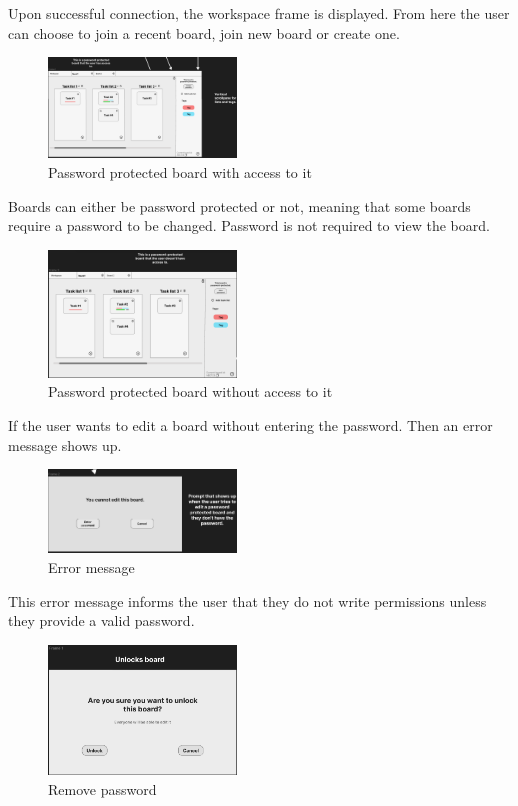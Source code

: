 Upon successful connection, the workspace frame is displayed. From here the user can choose to join a recent board, join new board or create one.

\begin{figure}[H]
\includegraphics[width=5cm]{content/mockups/overview_frame_1.png} 
\caption{Password protected board with access to it}
\end{figure}

Boards can either be password protected or not, meaning that some boards require a password to be changed. Password is not required to view the board.

\begin{figure}[H]
\includegraphics[width=5cm]{content/mockups/overview_frame_3.png} 
\caption{Password protected board without access to it}
\end{figure}

If the user wants to edit a board without entering the password. Then an error message shows up.

\begin{figure}[H]
\includegraphics[width=5cm]{content/mockups/overview_frame_2.png} 
\caption{Error message}
\end{figure}

This error message informs the user that they do not write permissions unless they provide a valid password.

\begin{figure}[H]
\includegraphics[width=5cm]{content/mockups/password_frame_1.png} 
\caption{Remove password}
\end{figure}


